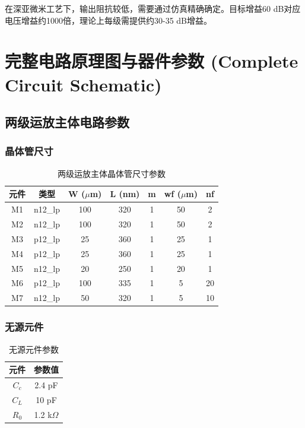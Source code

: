 \documentclass[UTF8,12pt,a4paper]{ctexart}
\begin{document}
在深亚微米工艺下，输出阻抗较低，需要通过仿真精确确定。目标增益60 dB对应电压增益约1000倍，理论上每级需提供约30-35 dB增益。

\section{完整电路原理图与器件参数 (Complete Circuit Schematic)}

\subsection{两级运放主体电路参数}

\subsubsection{晶体管尺寸}

\begin{table}[h]
\centering
\caption{两级运放主体晶体管尺寸参数}
\begin{tabular}{|c|c|c|c|c|c|c|}
\hline
\textbf{元件} & \textbf{类型} & \textbf{W ($\mu$m)} & \textbf{L (nm)} & \textbf{m} & \textbf{wf ($\mu$m)} & \textbf{nf} \\
\hline
M1 & n12\_lp & 100 & 320 & 1 & 50 & 2 \\
M2 & n12\_lp & 100 & 320 & 1 & 50 & 2 \\
M3 & p12\_lp & 25 & 360 & 1 & 25 & 1 \\
M4 & p12\_lp & 25 & 360 & 1 & 25 & 1 \\
M5 & n12\_lp & 20 & 250 & 1 & 20 & 1 \\
M6 & p12\_lp & 100 & 335 & 1 & 5 & 20 \\
M7 & n12\_lp & 50 & 320 & 1 & 5 & 10 \\
\hline
\end{tabular}
\end{table}

\subsubsection{无源元件}

\begin{table}[h]
\centering
\caption{无源元件参数}
\begin{tabular}{|c|c|}
\hline
\textbf{元件} & \textbf{参数值} \\
\hline
$C_c$ & 2.4 pF \\
$C_L$ & 10 pF \\
$R_0$ & 1.2 k$\Omega$ \\
\hline
\end{tabular}
\end{table}
\end{document}
